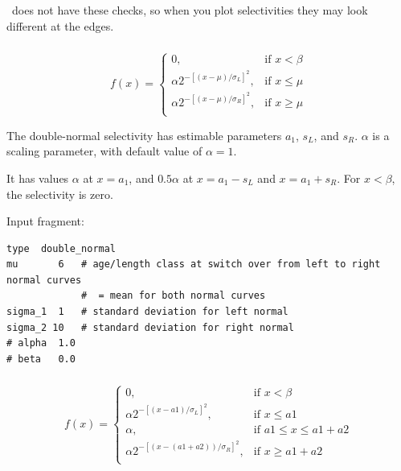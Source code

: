 \CNAME\ does not have these checks, so when you plot selectivities they may look different at the edges.

\subsubsection[Double-normal]{}\label{sec:Selectivity-DoubleNormal}

\begin{equation}
  f(x) = \begin{cases}
     0, & \text{if $x < \beta$} \\
    \alpha 2^{-[(x- \mu)/\sigma_L ]^2}, & \text{if $x \leq \mu$} \\
    \alpha 2^{-[(x- \mu)/\sigma_R ]^2}, & \text{if $x \ge \mu$}\\
  \end{cases}
\end{equation}

The double-normal selectivity has estimable parameters $a_1$, $s_L$, and $s_R$. $\alpha$ is a scaling parameter, with default value of $\alpha = 1$. 

It has values $\alpha$ at $x=a_1$, and $0.5 \alpha$ at $x=a_1-s_L$ and $x=a_1+s_R$. For $x < \beta$, the selectivity is zero.

Input fragment: {\small{\begin{verbatim}
type  double_normal
mu       6   # age/length class at switch over from left to right normal curves
             #  = mean for both normal curves
sigma_1  1   # standard deviation for left normal
sigma_2 10   # standard deviation for right normal
# alpha  1.0
# beta   0.0
\end{verbatim}}}

\subsubsection[Double-normal-plateau]{}\label{sec:Selectivity-DoubleNormalPlateau}

\begin{equation}
f(x) = \begin{cases}
0, & \text{if $x < \beta$} \\
\alpha 2^{-[(x- a1)/\sigma_L ]^2}, & \text{if $x \leq a1$} \\
\alpha, 							& \text{if $a1 \le x \leq a1 + a2 $}\\
\alpha 2^{-[(x- (a1 + a2))/\sigma_R ]^2}, & \text{if $x \ge a1 + a2 $}\\
\end{cases}
\end{equation}

